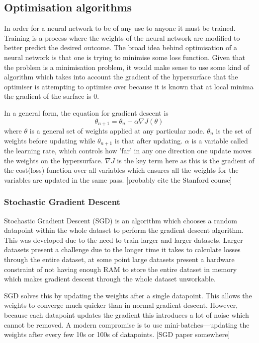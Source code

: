 \documentclass[a4paper,fleqn,usenatbib]{mnras}
\begin{document}
\subsection{Optimisation algorithms}
In order for a neural network to be of any use to anyone it must be trained. Training is a process where the weights of the neural network are modified to better predict the desired outcome. The broad idea behind optimisation of a neural network is that one is trying to minimise some loss function. Given that the problem is a minimisation problem, it would make sense to use some kind of algorithm which takes into account the gradient of the hypersurface that the optimiser is attempting to optimise over because it is known that at local minima the gradient of the surface is 0. 

In a general form, the equation for gradient descent is 
\begin{equation}
\theta_{n+1}=\theta_{n}-\alpha\nabla J(\theta)	
\end{equation}
where $\theta$ is a general set of weights applied at any particular node. $\theta_{n}$ is the set of weights before updating while $\theta_{n+1}$ is that after updating. $\alpha$ is a variable called the learning rate, which controls how 'far' in any one direction one update moves the weights on the hypersurface. $\nabla J$ is the key term here as this is the gradient of the cost(loss) function over all variables which ensures all the weights for the variables are updated in the same pass. [probably cite the Stanford course]

\subsubsection{Stochastic Gradient Descent}
Stochastic Gradient Descent (SGD) is an algorithm which chooses a random datapoint within the whole dataset to perform the gradient descent algorithm. This was developed due to the need to train larger and larger datasets. Larger datasets present a challenge due to the longer time it takes to calculate losses through the entire dataset, at some point large datasets present a hardware constraint of not having enough RAM to store the entire dataset in memory which makes gradient descent through the whole dataset unworkable. 

SGD solves this by updating the weights after a single datapoint. This allows the weights to converge much quicker than in normal gradient descent. However, because each datapoint updates the gradient this introduces a lot of noise which cannot be removed. A modern compromise is to use mini-batches---updating the weights after every few 10s or 100s of datapoints. [SGD paper somewhere]
\end{document}

